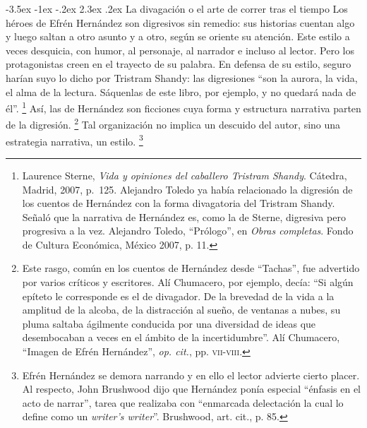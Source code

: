 \documentclass[14pt,twoside,final]{extbook} %
\makeatletter
\let\oldfootnote\footnote
\renewcommand\footnote[1]{%
\oldfootnote{\hspace{1mm}#1}}
\renewcommand\section{\@startsection {section}{1}{\z@}%
                                     {-3.5ex \@plus -1ex \@minus -.2ex}%
                                     {2.3ex \@plus .2ex}%
                                     {\normalfont\large\bfseries\sc}}
\makeatother
\begin{document}
\section{La divagación o el arte de correr tras el tiempo}\label{sec:la-divagacion-o-el-arte-de-correr-tras-el-tiempo}
Los héroes de Efrén Hernández son digresivos sin remedio: sus historias cuentan algo y luego saltan a otro asunto y a otro, según se oriente su atención. Este estilo a veces desquicia, con humor, al personaje, al narrador e incluso al lector. Pero los protagonistas creen en el trayecto de su palabra. En defensa de su estilo, seguro harían suyo lo dicho por Tristram Shandy: las digresiones ``son la aurora, la vida, el alma de la lectura. Sáquenlas de este libro, por ejemplo, y no quedará nada de él''.\footnote{Laurence Sterne, \emph{Vida y opiniones del caballero Tristram Shandy}. Cátedra, Madrid, 2007, p.~125. Alejandro Toledo ya había relacionado la digresión de los cuentos de Hernández con la forma divagatoria del Tristram Shandy. Señaló que la narrativa de Hernández es, como la de Sterne, digresiva pero progresiva a la vez.  Alejandro Toledo, ``Prólogo'', en \emph{Obras completas}. Fondo de Cultura Económica, México 2007, p. 11.} Así, las de Hernández son ficciones cuya forma y estructura narrativa parten de la digresión.\footnote{Este rasgo, común en los cuentos de Hernández desde ``Tachas'', fue advertido por varios críticos y escritores. Alí Chumacero, por ejemplo, decía: ``Si algún epíteto le corresponde es el de divagador. De la brevedad de la vida a la amplitud de la alcoba, de la distracción al sueño, de ventanas a nubes, su pluma saltaba ágilmente conducida por una diversidad de ideas que desembocaban a veces en el ámbito de la incertidumbre”. Alí Chumacero, ``Imagen de Efrén Hernández'', \emph{op. cit.}, pp. \textsc{vii-viii}.} Tal organización no implica un descuido del autor, sino una estrategia narrativa, un estilo.\footnote{Efrén Hernández se demora narrando y en ello el lector advierte cierto placer. Al respecto, John Brushwood dijo que Hernández ponía especial ``énfasis en el acto de narrar'', tarea que realizaba con ``enmarcada delectación la cual lo define como un \emph{writer’s writer}''. Brushwood, art. cit., p. 85.}
\end{document}
